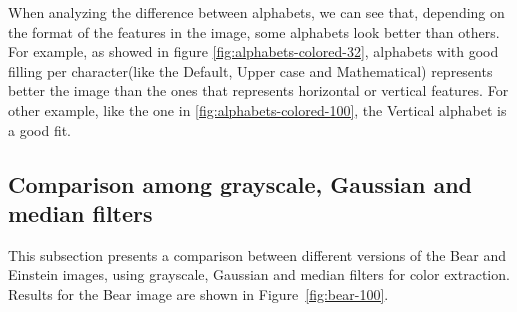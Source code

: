 \documentclass[]{IEEEtran}
\begin{document}
When analyzing the difference between alphabets, we can see that, depending on the format of the features in the image, some alphabets look better than others. For example, as showed in figure \ref{fig:alphabets-colored-32}, alphabets with good filling per character(like the Default, Upper case and Mathematical) represents better the image than the ones that represents horizontal or vertical features. For other example, like the one in \ref{fig:alphabets-colored-100}, the Vertical alphabet is a good fit. 



\subsection{Comparison among grayscale, Gaussian and median filters}

This subsection presents a comparison between different versions of the Bear and Einstein images, using grayscale, Gaussian and median filters for color extraction. Results for the Bear image are shown in Figure~\ref{fig:bear-100}.
\end{document}
